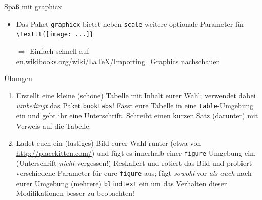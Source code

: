 \documentclass[11pt]{beamer}
\begin{document}
\begin{frame}[fragile]{Spaß mit graphicx}
\begin{itemize}
\item Das Paket \texttt{graphicx} bietet neben \texttt{scale} weitere optionale Parameter für \verb~\texttt{[image: ...]}~
\item[$\Rightarrow$] Einfach schnell auf\\
 \url{en.wikibooks.org/wiki/LaTeX/Importing_Graphics} nachschauen \smiley
\end{itemize}
\end{frame}

\begin{frame}{Übungen}
\begin{enumerate}
\item Erstellt eine kleine (schöne) Tabelle mit Inhalt eurer Wahl; verwendet dabei \emph{umbedingt} das Paket \texttt{booktabs}! Fasst eure Tabelle in eine \texttt{table}-Umgebung ein und gebt ihr eine Unterschrift. Schreibt einen kurzen Satz (darunter) mit Verweis auf die Tabelle.
\item Ladet euch ein (lustiges) Bild eurer Wahl runter (etwa von \url{http://placekitten.com/}) und fügt es innerhalb einer \texttt{figure}-Umgebung ein. (Unterschrift \emph{nicht} vergessen!) Reskaliert und rotiert das Bild und probiert verschiedene Parameter für eure \texttt{figure} aus; fügt \emph{sowohl} vor \emph{als auch} nach eurer Umgebung (mehrere) \texttt{blindtext} ein um das Verhalten dieser Modifikationen besser zu beobachten!
\end{enumerate}
\end{frame}
\end{document}
